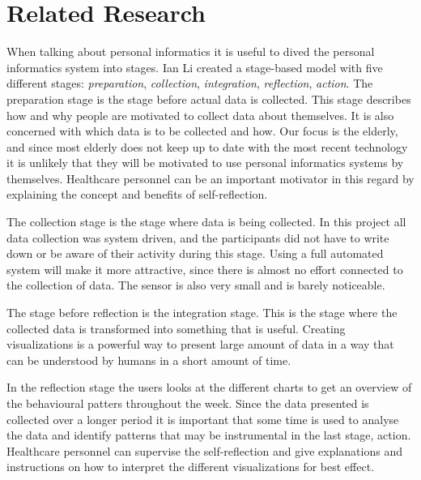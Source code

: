 \section{Related Research}

When talking about personal informatics it is useful to dived the personal informatics system into stages. Ian Li %
created a stage-based model \cite{li2010} with five different stages: \emph{preparation}, \emph{collection}, \emph{integration}, \emph{reflection}, \emph{action}. The preparation stage is the stage before actual data is collected. This stage describes how and why people are motivated to collect data about themselves. It is also concerned with which data is to be collected and how. Our focus is the elderly, and since most elderly does not keep up to date with the most recent technology it is unlikely that they will be motivated to use personal informatics systems by themselves. Healthcare personnel can be an important motivator in this regard by explaining the concept and benefits of self-reflection.

The collection stage is the stage where data is being collected. In this project all data collection was system driven, and the participants did not have to write down or be aware of their activity during this stage. Using a full automated system will make it more attractive, since there is almost no effort connected to the collection of data. The sensor is also very small and is barely noticeable.

The stage before reflection is the integration stage. This is the stage where the collected data is transformed into something that is useful. Creating visualizations is a powerful way to present large amount of data in a way that can be understood by humans in a short amount of time. 

In the reflection stage the users looks at the different charts to get an overview of the behavioural patters throughout the week. Since the data presented is collected over a longer period it is important that some time is used to analyse the data and identify patterns that may be instrumental in the last stage, action. Healthcare personnel can supervise the self-reflection and give explanations and instructions on how to interpret the different visualizations for best effect.

